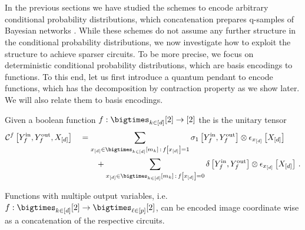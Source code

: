 \section{\ComputationCircuits{}}


In the previous sections we have studied the schemes to encode arbitrary conditional probability distributions, which concatenation prepares q-samples of Bayesian networks \cite{low_quantum_2014}.
While these schemes do not assume any further structure in the conditional probability distributions, we now investigate how to exploit the structure to achieve sparser circuits.
To be more precise, we focus on deterministic conditional probability distributions, which are basis encodings to functions.
%
To this end, let us first introduce a quantum pendant to encode functions, which has the decomposition by contraction property as we show later.
We will also relate them to basis encodings.

\begin{definition}[\ComputationCircuit{}]
    Given a boolean function $\exformula:\atomstates\rightarrow[2]$ the \computationCircuit{} is the unitary tensor
    \begin{align*}
        \qcbencodingofat{\exformula}{\cheadvariableof{\exformula}{\insymbol},\cheadvariableof{\exformula}{\outsymbol},\shortcatvariables}
        &\quad=
        \sum_{\shortcatindicesin\wcols\exformulaat{\shortcatindices}=1}
        \paulixat{\cheadvariableof{\exformula}{\insymbol},\cheadvariableof{\exformula}{\outsymbol}} \otimes
        \onehotmapofat{\shortcatindices}{\shortcatvariables} \\
        & \quad \quad \quad +
        \sum_{\shortcatindicesin\wcols\exformulaat{\shortcatindices}=0}
        \identityat{\cheadvariableof{\exformula}{\insymbol},\cheadvariableof{\exformula}{\outsymbol}} \otimes
        \onehotmapofat{\shortcatindices}{\shortcatvariables} \, .
    \end{align*}
\end{definition}



Functions with multiple output variables, i.e. $\exformula:\atomstates\rightarrow\bigtimes_{\selindexin}[2]$, can be encoded image coordinate wise as a concatenation of the respective circuits.


